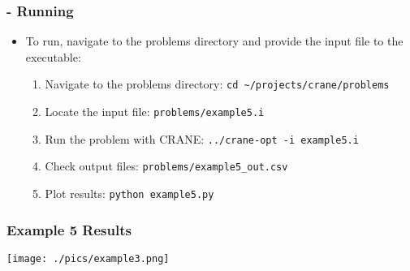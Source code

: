 \begin{frame}[fragile]
	\frametitle{\insertsubsectionhead \hspace{1pt} - Running}
		\begin{itemize}
			\item To run, navigate to the problems directory and provide the input file to the executable:
			\begin{enumerate}
				\item Navigate to the problems directory: \newline
				\hspace*{8pt} \texttt{cd \textasciitilde/projects/crane/problems}
				\item Locate the input file: \newline
				\hspace*{8pt} \texttt{problems/example5.i}
				\item Run the problem with CRANE: \newline
				\hspace*{8pt} \texttt{../crane-opt -i example5.i}
				\item Check output files: \newline
				\hspace*{8pt} \texttt{problems/example5\_out.csv}
				\item Plot results: \newline
				\hspace*{8pt} \texttt{python example5.py}
			\end{enumerate}
		\end{itemize}
\end{frame}

\begin{frame}
	\frametitle{Example 5 Results}
	\centering
	\texttt{[image: ./pics/example3.png]}
\end{frame}